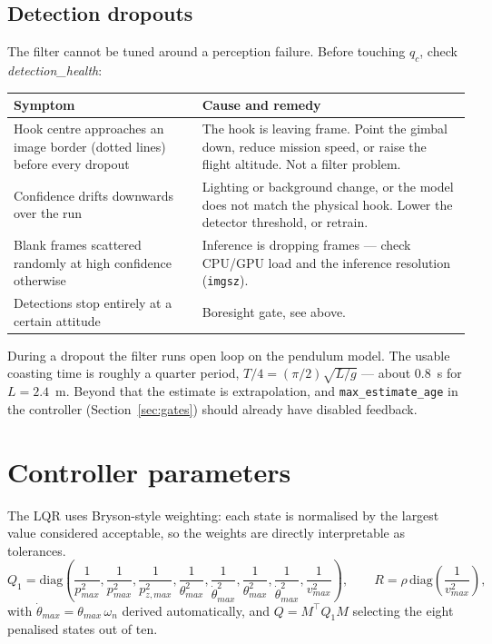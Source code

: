 \documentclass[11pt,a4paper]{article}
\newcommand{\param}[1]{\texttt{\small #1}}
\newcommand{\plot}[1]{\textit{#1}}
\begin{document}
\subsection{Detection dropouts}
\label{sec:dropouts}

The filter cannot be tuned around a perception failure. Before touching $q_c$,
check \plot{detection\_health}:

\begin{center}
\begin{tabular}{@{}p{6.4cm}p{8.2cm}@{}}
\toprule
\textbf{Symptom} & \textbf{Cause and remedy} \\
\midrule
Hook centre approaches an image border (dotted lines) before every dropout
& The hook is leaving frame. Point the gimbal down, reduce mission speed, or
raise the flight altitude. Not a filter problem. \\
Confidence drifts downwards over the run
& Lighting or background change, or the model does not match the physical hook.
Lower the detector threshold, or retrain. \\
Blank frames scattered randomly at high confidence otherwise
& Inference is dropping frames --- check CPU/GPU load and the inference
resolution (\param{imgsz}). \\
Detections stop entirely at a certain attitude
& Boresight gate, see above. \\
\bottomrule
\end{tabular}
\end{center}

During a dropout the filter runs open loop on the pendulum model. The
usable coasting time is roughly a quarter period,
$T/4 = (\pi/2)\sqrt{L/g}$ --- about $0.8$~s for $L=2.4$~m. Beyond that the
estimate is extrapolation, and \param{max\_estimate\_age} in the controller
(Section~\ref{sec:gates}) should already have disabled feedback.

\section{Controller parameters}
\label{sec:control}

The LQR uses Bryson-style weighting: each state is normalised by the largest
value considered acceptable, so the weights are directly interpretable as
tolerances.
%
\begin{equation}
Q_1=\mathrm{diag}\!\left(
\frac{1}{p_{max}^2},\frac{1}{p_{max}^2},\frac{1}{p_{z,max}^2},
\frac{1}{\theta_{max}^2},\frac{1}{\dot\theta_{max}^2},
\frac{1}{\theta_{max}^2},\frac{1}{\dot\theta_{max}^2},
\frac{1}{v_{max}^2}\right),
\qquad
R=\rho\,\mathrm{diag}\!\left(\frac{1}{v_{max}^2}\right),
\label{eq:bryson}
\end{equation}
%
with $\dot\theta_{max}=\theta_{max}\,\omega_n$ derived automatically, and
$Q=M^\top Q_1 M$ selecting the eight penalised states out of ten.
\end{document}
